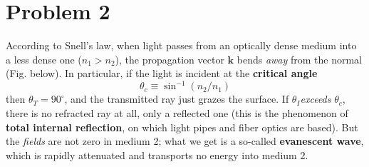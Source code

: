 \documentclass[10pt]{article}
\begin{document}
	\pagebreak
	\section*{Problem 2} 
	According to Snell's law, when light passes from an optically dense medium into a less dense one (\( n_1
	> n_2\)), the propagation vector \( \mathbf{k} \) bends \textit{away} from the normal (Fig. below). In
	particular, if the light is incident at the \textbf{critical angle}
	\[
		\theta_c \equiv \sin^{-1}(n_2 / n_1)
	\]
	then \( \theta_T = 90^{\circ} \), and the transmitted ray just grazes the surface. If \( \theta_I
	\)\textit{exceeds} \( \theta_c \), there is no refracted ray at all, only a reflected one (this is the
	phenomenon of \textbf{total internal reflection}, on which light pipes and fiber optics are based). But
	the \textit{fields} are not zero in medium 2; what we get is a so-called \textbf{evanescent wave}, which
	is rapidly attenuated and transports no energy into medium 2. 
\end{document}

